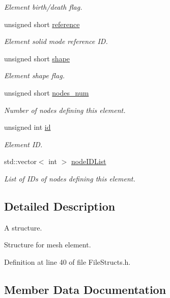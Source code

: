 \begin{DoxyCompactItemize}
\begin{DoxyCompactList}\small\item\em Element birth/death flag. \end{DoxyCompactList}\item 
unsigned short \hyperlink{struct___elements_s_af9fa947d626f4bcdcb030fe4fab611c4}{reference}
\begin{DoxyCompactList}\small\item\em Element solid mode reference ID. \end{DoxyCompactList}\item 
unsigned short \hyperlink{struct___elements_s_aff93e58a2996c7dcae7441a7d6804da0}{shape}
\begin{DoxyCompactList}\small\item\em Element shape flag. \end{DoxyCompactList}\item 
unsigned short \hyperlink{struct___elements_s_a49bec774408021bd15702208237fb17f}{nodes\+\_\+num}
\begin{DoxyCompactList}\small\item\em Number of nodes defining this element. \end{DoxyCompactList}\item 
unsigned int \hyperlink{struct___elements_s_a782d0149d17748d22630799112b10680}{id}
\begin{DoxyCompactList}\small\item\em Element ID. \end{DoxyCompactList}\item 
std\+::vector$<$ int $>$ \hyperlink{struct___elements_s_a9e3631ebed48f8c5869f08f0970c251c}{node\+I\+D\+List}
\begin{DoxyCompactList}\small\item\em List of I\+Ds of nodes defining this element. \end{DoxyCompactList}\end{DoxyCompactItemize}


\subsection{Detailed Description}
A structure. 

Structure for mesh element. 

Definition at line 40 of file File\+Structs.\+h.



\subsection{Member Data Documentation}
